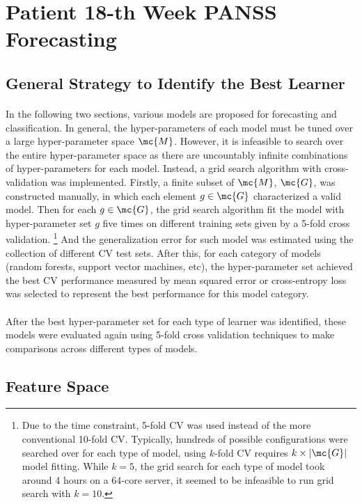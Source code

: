 \documentclass[11pt]{article}
\begin{document}
	\section{Patient 18-th Week PANSS Forecasting}
	\subsection{General Strategy to Identify the Best Learner} 
	\paragraph{} In the following two sections, various models are proposed for forecasting and classification. In general, the hyper-parameters of each model must be tuned over a large hyper-parameter space $\mc{M}$. However, it is infeasible to search over the entire hyper-parameter space as there are uncountably infinite combinations of hyper-parameters for each model. Instead, a grid search algorithm with cross-validation was implemented. Firstly, a finite subset of $\mc{M}$, $\mc{G}$, was constructed manually, in which each element $g \in \mc{G}$ characterized a valid model. Then for each $g \in \mc{G}$, the grid search algorithm fit the model with hyper-parameter set $g$ five times on different training sets given by a 5-fold cross validation.
	\footnote{Due to the time constraint, 5-fold CV was used instead of the more conventional 10-fold CV. Typically, hundreds of possible configurations were searched over for each type of model, using $k$-fold CV requires $k \times |\mc{G}|$ model fitting. While $k=5$, the grid search for each type of model took around 4 hours on a 64-core server, it seemed to be infeasible to run grid search with $k=10$.}
	And the generalization error for such model was estimated using the collection of different CV test sets. After this, for each category of models (random forests, support vector machines, etc), the hyper-parameter set  achieved the best CV performance measured by mean squared error or cross-entropy loss was selected to represent the best performance for this model category.
	
	 \paragraph{} After the best hyper-parameter set for each type of learner was identified, these models were evaluated again using 5-fold cross validation techniques to make comparisons across different types of models.

	\subsection{Feature Space}
\end{document}
